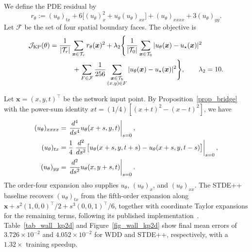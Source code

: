 \documentclass[final,oneeqnum]{siamltex}
\newcommand{\bx}{\bm{x}}
\begin{document}
We define the PDE residual by
\begin{equation*}
    r_\theta := (u_\theta)_{tx} + 6 \bigl[(u_\theta)_x^2 + u_\theta (u_\theta)_{xx}\bigr] + (u_\theta)_{xxxx} + 3 (u_\theta)_{yy}.
\end{equation*}
Let $\mathcal F$ be the set of four spatial boundary faces.
The objective is
\begin{align}
    \mathcal J_{\rm KP}(\theta) = {} & \frac{1}{|\mathcal T_r|} \sum_{\bx \in \mathcal T_r} r_\theta(\bx)^2 + \lambda_2 \Biggl\{\frac{1}{|\mathcal T_0|} \sum_{\bx \in \mathcal T_0} |u_\theta(\bx) - u_\star(\bx)|^2 \notag                  \\
                                     & \quad\quad + \sum_{F \in \mathcal F} \frac{1}{256} \sum_{\substack{\bx \in \mathcal T_b\\(x, y) \in F}} |u_\theta(\bx) - u_\star(\bx)|^2\Biggr\}, \quad\quad \lambda_2 = 10.\label{eq_num_kp_loss}
\end{align}

Let $\bx = (x, y, t)^\top$ be the network input point.
By Proposition~\ref{prop_bridge} with the power-sum identity $x t = (1 / 4) [(x + t)^2 - (x - t)^2]$, we have
\begin{align}
    (u_\theta)_{xxxx} & = \left.\frac{d^4}{d s^4} u_\theta(x + s, y, t)\right|_{s = 0}, \notag                                                                                  \\
    (u_\theta)_{tx}   & = \frac{1}{4} \left.\frac{d^2}{d s^2} \bigl[u_\theta(x + s, y, t + s) - u_\theta(x + s, y, t - s)\bigr]\right|_{s = 0}, \label{eq_num_kp_reconstruction} \\
    (u_\theta)_{yy}   & = \left.\frac{d^2}{d s^2} u_\theta(x, y + s, t)\right|_{s = 0}. \notag
\end{align}
The order-four expansion also supplies $u_\theta$, $(u_\theta)_x$, and $(u_\theta)_{xx}$.
The STDE++ baseline recovers $(u_\theta)_{tx}$ from the fifth-order expansion along $\bx + s^2 (1, 0, 0)^\top / 2 + s^3 (0, 0, 1)^\top / 6$, together with coordinate Taylor expansions for the remaining terms, following its published implementation~\cite{Shi2026stdepp}.
Table~\ref{tab_wall_kp2d} and Figure~\ref{fig_wall_kp2d} show final mean errors of $3.726 \times 10^{-2}$ and $4.052 \times 10^{-2}$ for WDD and STDE++, respectively, with a $1.32 \times$ training speedup.

\begin{table}[htbp]
    \centering
    \scriptsize
    \setlength{\tabcolsep}{3pt}
    \caption{Numerical results for the KP-II equation~\eqref{eq_num_kp} after 20,000 updates, reported as means and sample standard deviations over five seeds.}
    \label{tab_wall_kp2d}
    
\end{table}
\end{document}
